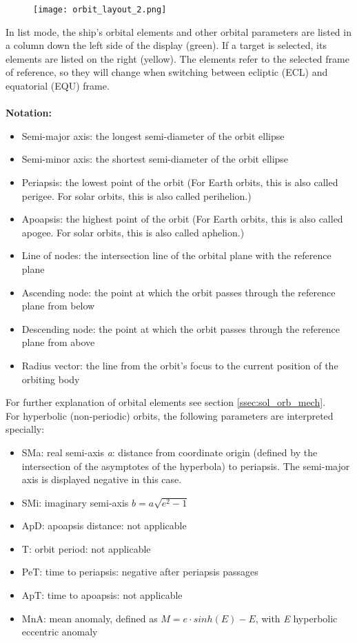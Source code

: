 \documentclass[Orbiter User Manual.tex]{subfiles}
\begin{document}
\begin{figure}[H]
  \centering
  \texttt{[image: orbit\_layout\_2.png]}
\end{figure}

\noindent
In list mode, the ship's orbital elements and other orbital parameters are listed in a column down the left side of the display (green). If a target is selected, its elements are listed on the right (yellow). The elements refer to the selected frame of reference, so they will change when switching between ecliptic (ECL) and equatorial (EQU) frame.\\
\\
\textbf{Notation:}

\begin{itemize}
\item Semi-major axis: the longest semi-diameter of the orbit ellipse
\item Semi-minor axis: the shortest semi-diameter of the orbit ellipse
\item Periapsis: the lowest point of the orbit (For Earth orbits, this is also called perigee. For solar orbits, this is also called perihelion.)
\item Apoapsis: the highest point of the orbit (For Earth orbits, this is also called apogee. For solar orbits, this is also called aphelion.)
\item Line of nodes: the intersection line of the orbital plane with the reference plane
\item Ascending node: the point at which the orbit passes through the reference plane from below
\item Descending node: the point at which the orbit passes through the reference plane from above
\item Radius vector: the line from the orbit's focus to the current position of the orbiting body
\end{itemize}

\noindent
For further explanation of orbital elements see section \ref{ssec:sol_orb_mech}.\\
For hyperbolic (non-periodic) orbits, the following parameters are interpreted specially:

\begin{itemize}
\item SMa: real semi-axis \textit{a}: distance from coordinate origin (defined by the intersection of the asymptotes of the hyperbola) to periapsis. The semi-major axis is displayed negative in this case.
\item SMi: imaginary semi-axis $b = a \sqrt{e^{2} - 1}$
\item ApD: apoapsis distance: not applicable
\item T: orbit period: not applicable
\item PeT: time to periapsis: negative after periapsis passages
\item ApT: time to apoapsis: not applicable
\item MnA: mean anomaly, defined as $M = e \cdot sinh(E) - E$, with \textit{E} hyperbolic eccentric anomaly
\end{itemize}
\end{document}
